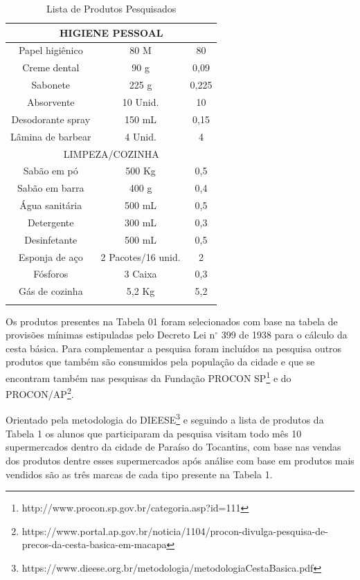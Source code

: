 \documentclass{ifto-tex}
\begin{document}
\begin{longtable}{|c|c|c|}
	\hline
	\multicolumn{3}{|c|}{HIGIENE PESSOAL}                      \\
	\hline
	Papel higiênico   & 80 M               & 80           \\
	\hline
	Creme dental      & 90 g               & 0,09            \\
	\hline
	Sabonete          & 225 g              & 0,225           \\
	\hline
	Absorvente        & 10 Unid.           & 10             \\
	\hline
	Desodorante spray & 150 mL             & 0,15            \\
	\hline
	Lâmina de barbear & 4 Unid.            & 4               \\
	\hline
	\multicolumn{3}{|c|}{LIMPEZA/COZINHA}                      \\
	\hline
	Sabão em pó       & 500 Kg             & 0,5             \\
	\hline
	Sabão em barra    & 400 g              & 0,4             \\
	\hline
	Água sanitária    & 500 mL             & 0,5             \\
	\hline
	Detergente        & 300 mL             & 0,3             \\
	\hline
	Desinfetante      & 500 mL             & 0,5             \\
	\hline
	Esponja de aço    & 2 Pacotes/16 unid. & 2               \\
	\hline
	Fósforos          & 3 Caixa            & 0,3             \\
	\hline
	Gás de cozinha    & 5,2 Kg             & 5,2       \\
	\hline     
	\caption{Lista de Produtos Pesquisados}
\end{longtable}

Os produtos presentes na Tabela 01 foram selecionados com base na tabela de provisões mínimas estipuladas pelo Decreto Lei n$^{\circ}$ 399 de 1938 para o cálculo da cesta básica. Para complementar a pesquisa foram incluídos na pesquisa outros produtos que também são consumidos pela população da cidade e que se encontram também nas pesquisas da Fundação PROCON SP\footnote{http://www.procon.sp.gov.br/categoria.asp?id=111} e do PROCON/AP\footnote{https://www.portal.ap.gov.br/noticia/1104/procon-divulga-pesquisa-de-precos-da-cesta-basica-em-macapa}.

Orientado pela metodologia do DIEESE\footnote{https://www.dieese.org.br/metodologia/metodologiaCestaBasica.pdf} e seguindo a lista de produtos da Tabela 1 os alunos que participaram da pesquisa visitam todo mês 10 supermercados dentro da cidade de Paraíso do Tocantins, com base nas vendas dos produtos dentre esses supermercados após análise com base em produtos mais vendidos são as três marcas de cada tipo presente na Tabela 1.
\end{document}
